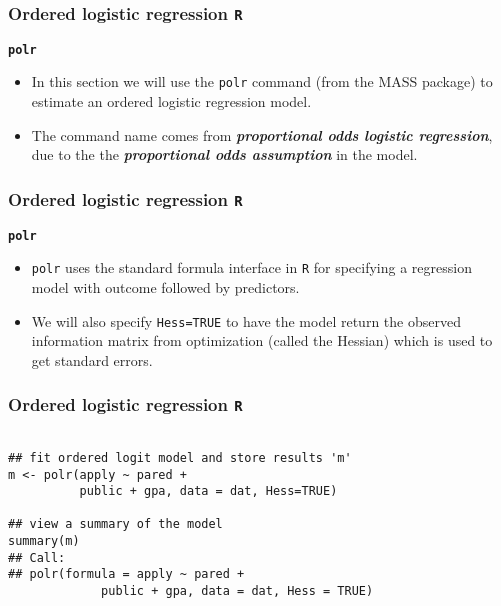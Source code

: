 \documentclass[00-GLMregslides.tex]{subfiles}
\begin{document}
\newpage
\Large



\begin{frame}[fragile]
	\frametitle{Ordered logistic regression \texttt{R} }
	\Large
\textbf{\texttt{polr}}
\begin{itemize}
\item In this section we will use the \texttt{polr} command (from the MASS package) to estimate an ordered logistic 
regression model. 
\item The command name comes from \textbf{\textit{proportional odds logistic regression}}, due to the the \textbf{\textit{proportional odds assumption}} in the model. 
\end{itemize}
\end{frame}
\begin{frame}[fragile]
	\frametitle{Ordered logistic regression \texttt{R} }
	\Large
\textbf{\texttt{polr}}
\begin{itemize}
\item \texttt{polr} uses the standard formula interface in \texttt{R} for specifying a regression model with outcome 
followed by predictors. 
\item We will also specify \texttt{Hess=TRUE} to have the model return the observed information matrix from optimization (called the Hessian) which is used to get standard errors.
\end{itemize}
\end{frame}
\begin{frame}[fragile]
\frametitle{Ordered logistic regression \texttt{R} }
\large
\begin{framed}		
\begin{verbatim}
	
## fit ordered logit model and store results 'm'
m <- polr(apply ~ pared + 
          public + gpa, data = dat, Hess=TRUE)

## view a summary of the model
summary(m)
## Call:
## polr(formula = apply ~ pared + 
             public + gpa, data = dat, Hess = TRUE)
\end{verbatim}
\end{framed}
\end{frame}
\end{document}
